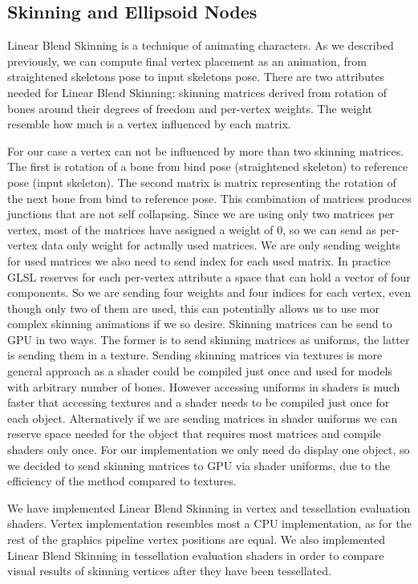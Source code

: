 \subsection{Skinning and Ellipsoid Nodes}

Linear Blend Skinning is a technique of animating characters.
As we described previously, we can compute final vertex placement as an animation, from straightened skeletons pose to input skeletons pose.
There are two attributes needed for Linear Blend Skinning: skinning matrices derived from rotation of bones around their degrees of freedom and per-vertex weights.
The weight resemble how much is a vertex influenced by each matrix.

For our case a vertex can not be influenced by more than two skinning matrices.
The first is rotation of a bone from bind pose (straightened skeleton) to reference pose (input skeleton).
The second matrix is matrix representing the rotation of the next bone from bind to reference pose.
This combination of matrices produces junctions that are not self collapsing.
Since we are using only two matrices per vertex, most of the matrices have assigned a weight of 0, so we can send as per-vertex data only weight for actually used matrices.
We are only sending weights for used matrices we also need to send index for each used matrix.
In practice GLSL reserves for each per-vertex attribute a space that can hold a vector of four components.
So we are sending four weights and four indices for each vertex, even though only two of them are used, this can potentially allows us to use mor complex skinning animations if we so desire.
Skinning matrices can be send to GPU in two ways.
The former is to send skinning matrices as uniforms, the latter is sending them in a texture.
Sending skinning matrices via textures is more general approach as a shader could be compiled just once and used for models with arbitrary number of bones.
However accessing uniforms in shaders is much faster that accessing textures and a shader needs to be compiled just once for each object.
Alternatively if we are sending matrices in shader uniforms we can reserve space needed for the object that requires most matrices and compile shaders only once.
For our implementation we only need do display one object, so we decided to send skinning matrices to GPU via shader uniforms, due to the efficiency of the method compared to textures.

We have implemented Linear Blend Skinning in vertex and tessellation evaluation shaders.
Vertex implementation resembles most a CPU implementation, as for the rest of the graphics pipeline vertex positions are equal.
We also implemented Linear Blend Skinning in tessellation evaluation shaders in order to compare visual results of skinning vertices after they have been tessellated.

